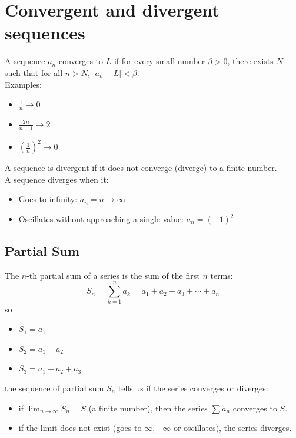 \documentclass{article}
\begin{document}
                    \section{Convergent and divergent sequences}
                        A sequence \({a_n}\) converges to \(L\) if for every small number \(\beta > 0 \), there exists \(N\) such that for all \(n > N\), \(|a_n - L| < \beta\). \\
                        Examples: 
                        \begin{itemize}
                            \item \(\frac{1}{n} \rightarrow 0\)
                            \item \(\frac{2n}{n + 1} \rightarrow 2\)
                            \item \({(\frac{1}{n})}^2 \rightarrow 0\)
                        \end{itemize}

                        A sequence is divergent if it does not converge (diverge) to a finite number. \\ 
                        A sequence diverges when it: 
                        \begin{itemize}
                            \item Goes to infinity: \(a_n = n \rightarrow \infty\)
                            \item Oscillates without approaching a single value: \(a_n = {(-1)}^2\)
                        \end{itemize}
                        \subsection{Partial Sum}
                            The \(n\)-th partial sum of a series is the sum of the first \(n\) terms: \\
                                \[S_n = \sum_{k = 1}^{n} a_k = a_1 + a_2 + a_3 + \cdots + a_n\]
                            so 
                            \begin{itemize}
                                \item \(S_1 = a_1\)
                                \item \(S_2 = a_1 + a_2\)
                                \item \(S_3 = a_1 + a_2 + a_3\)
                            \end{itemize}
                            the sequence of partial sum \({S_n}\) tells us if the series converges or diverges: 
                            \begin{itemize}
                                \item if \(\lim_{n \rightarrow \infty} S_n = S \) (a finite number), then the series \(\sum a_n\) converges to \(S\).
                                \item if the limit does not exist (goes to \(\infty , -\infty\) or oscillates), the series diverges.
                            \end{itemize}
\end{document}
